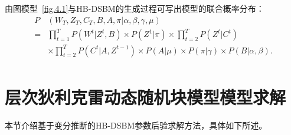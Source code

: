 由图模型~\ref{fig.4.1}与HB-DSBM的生成过程可写出模型的联合概率分布：
\begin{equation}
\begin{split}
P&(W_T, Z_T, C_T, B, A, \pi | \alpha, \beta, \gamma, \mu) \\
= & \prod_{t=1}^T P(W^t | Z^t, B) \times  P(Z^1 | \pi) \times \prod_{t=2}^T P(Z^t | C^t) \\
& \times \prod_{t=2}^T P(C^t | A, Z^{t-1}) \times P(A | \mu) \times P(\pi | \gamma) \times P(B | \alpha, \beta) .\\
\end{split}
\end{equation}






\section{层次狄利克雷动态随机块模型模型求解}
本节介绍基于变分推断的HB-DSBM参数后验求解方法，具体如下所述。

